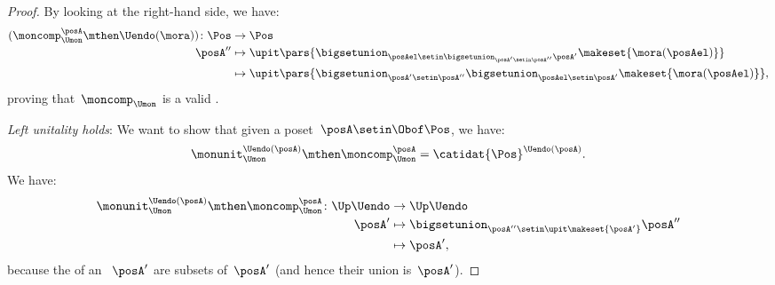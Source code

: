 \begin{proof}
    By looking at the right-hand side, we have:
    \begin{equation}
        \begin{aligned}
            (\moncomp_{\Umon}^\posA \mthen \Uendo(\mora))
            \colon \Pos & \to \Pos \\
            \posA''     & \mapsto \upit \pars{ \bigsetunion_{\posAel \setin \bigsetunion_{\posA'\setin \posA''}\posA'} \makeset{ \mora(\posAel)}} \\
                        & \mapsto \upit \pars{ \bigsetunion_{\posA'\setin \posA''}\bigsetunion_{\posAel \setin \posA'}\makeset{\mora(\posAel)}},
        \end{aligned}
    \end{equation}
    proving that~$\moncomp_{\Umon}$ is a valid .

    \emph{Left unitality holds}: We want to show that given a poset~$\posA\setin \Obof\Pos$, we have:
    \begin{equation}
        \monunit_{\Umon}^{\Uendo(\posA)}\mthen \moncomp_{\Umon}^{\posA}=\catidat{\Pos}^{\Uendo(\posA)}.
    \end{equation}
    We have:
    \begin{equation}
        \begin{aligned}
            \monunit_{\Umon}^{\Uendo(\posA)}\mthen \moncomp_{\Umon}^{\posA}\colon \Up \Uendo & \to \Up \Uendo \\
            \posA'                                                                           & \mapsto \bigsetunion_{\posA''\setin \upit \makeset{ \posA'}} \posA'' \\
                                                                                             & \mapsto \posA',
        \end{aligned}
    \end{equation}
    because the  of an ~$\posA'$ are subsets of~$\posA'$ (and hence their union is~$\posA'$).


\end{proof}
